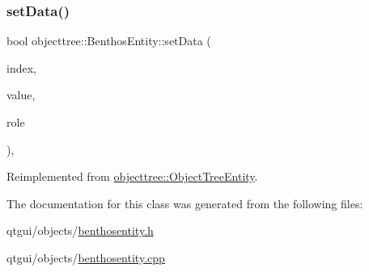 \subsubsection{\texorpdfstring{setData()}{setData()}}
{\footnotesize\ttfamily bool objecttree\+::\+Benthos\+Entity\+::set\+Data (\begin{DoxyParamCaption}\item[{const Q\+Model\+Index \&}]{index,  }\item[{const Q\+Variant \&}]{value,  }\item[{int}]{role }\end{DoxyParamCaption})\hspace{0.3cm}{\ttfamily [override]}, {\ttfamily [virtual]}}



Reimplemented from \mbox{\hyperlink{classobjecttree_1_1_object_tree_entity_ab6742194e637093cb1571998bee88ff5}{objecttree\+::\+Object\+Tree\+Entity}}.



The documentation for this class was generated from the following files\+:\begin{DoxyCompactItemize}
\item 
qtgui/objects/\mbox{\hyperlink{benthosentity_8h}{benthosentity.\+h}}\item 
qtgui/objects/\mbox{\hyperlink{benthosentity_8cpp}{benthosentity.\+cpp}}\end{DoxyCompactItemize}
